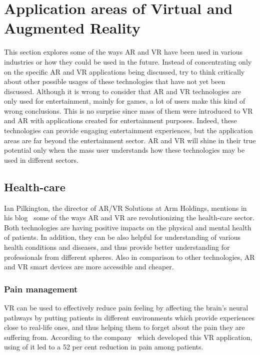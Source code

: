 \documentclass[12pt]{article}
\begin{document}
\section{Application areas of Virtual and Augmented Reality} \label{sec:Application areas of Virtual and Augmented Reality}
This section explores some of the ways \ac{AR} and \ac{VR} have been used in various industries or how they could be used in the future. Instead of concentrating only on the specific \ac{AR} and \ac{VR} applications being discussed, try to think critically about other possible usages of these technologies that have not yet been discussed. Although it is wrong to consider that \ac{AR} and \ac{VR} technologies are only used for entertainment, mainly for games, a lot of users make this kind of wrong conclusions. This is no surprise since mass of them were introduced to \ac{VR} and \ac{AR} with applications created for entertainment purposes. Indeed, these technologies can provide engaging entertainment experiences, but the application areas are far beyond the entertainment sector. \ac{AR} and \ac{VR} will shine in their true potential only when the mass user understands how these technologies may be used in different sectors.

\subsection{Health-care} \label{sec:Health-care}
Ian Pilkington, the director of \ac{AR}/\ac{VR} Solutions at Arm Holdings, mentions in his blog~\cite{healthCare} some of the ways \ac{AR} and \ac{VR} are revolutionizing the health-care sector. Both technologies are having positive impacts on the physical and mental health of patients. In addition, they can be also helpful for understanding of various health conditions and diseases, and thus provide better understanding for professionals from different spheres. Also in comparison to other technologies, \ac{AR} and \ac{VR} smart devices are more accessible and cheaper.

\subsubsection{Pain management} \label{sec:Pain management}
\ac{VR} can be used to effectively reduce pain feeling by affecting the brain's neural pathways by putting patients in different environments which provide experiences close to real-life ones, and thus helping them to forget about the pain they are suffering from. According to the company~\cite{healthCare} which developed this \ac{VR} application, using of it led to a 52 per cent reduction in pain among patients.
\end{document}
